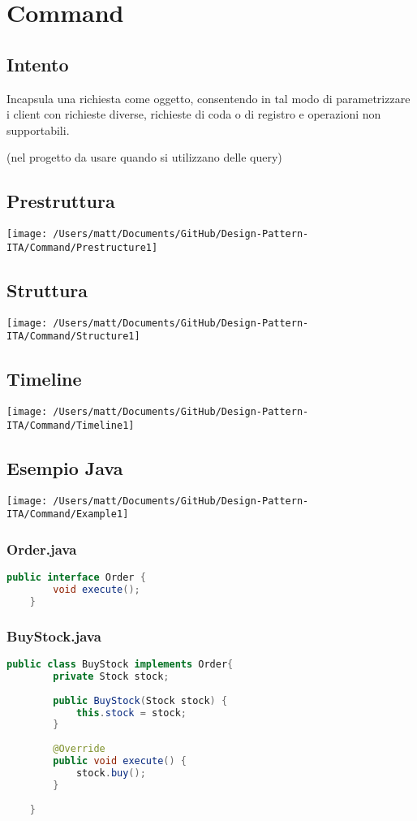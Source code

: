 \chapter{Command}
\section{Intento}

Incapsula una richiesta come oggetto, consentendo in tal modo di parametrizzare i client con richieste diverse, richieste di coda o di registro e operazioni non supportabili.

(nel progetto da usare quando si utilizzano delle query)


\section{Prestruttura}

\texttt{[image: /Users/matt/Documents/GitHub/Design-Pattern-ITA/Command/Prestructure1]}


\section{Struttura}

\texttt{[image: /Users/matt/Documents/GitHub/Design-Pattern-ITA/Command/Structure1]}


\section{Timeline}

\texttt{[image: /Users/matt/Documents/GitHub/Design-Pattern-ITA/Command/Timeline1]}


\section{Esempio Java}
\texttt{[image: /Users/matt/Documents/GitHub/Design-Pattern-ITA/Command/Example1]}

\subsection{Order.java}
\begin{lstlisting}[language=java]
    public interface Order {
        void execute();
    }
\end{lstlisting}

\subsection{BuyStock.java}
\begin{lstlisting}[language=java]
    public class BuyStock implements Order{
        private Stock stock;
    
        public BuyStock(Stock stock) {
            this.stock = stock;
        }
    
        @Override
        public void execute() {
            stock.buy();
        }
        
    }
\end{lstlisting}

